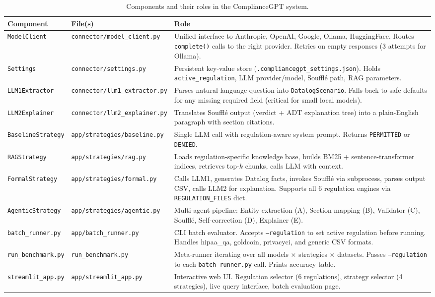 \documentclass[11pt,letterpaper]{article}
\begin{document}
\begin{appendices}
\begin{table}[H]
\centering
\begin{tabularx}{\textwidth}{llX}
\toprule
\textbf{Component} & \textbf{File(s)} & \textbf{Role} \\
\midrule
\texttt{ModelClient} & \texttt{connector/model\_client.py} & Unified interface to Anthropic, OpenAI, Google, Ollama, HuggingFace. Routes \texttt{complete()} calls to the right provider. Retries on empty responses (3 attempts for Ollama). \\
\texttt{Settings} & \texttt{connector/settings.py} & Persistent key-value store (\texttt{.compliancegpt\_settings.json}). Holds \texttt{active\_regulation}, LLM provider/model, Souffl\'{e} path, RAG parameters. \\
\texttt{LLM1Extractor} & \texttt{connector/llm1\_extractor.py} & Parses natural-language question into \texttt{DatalogScenario}. Falls back to safe defaults for any missing required field (critical for small local models). \\
\texttt{LLM2Explainer} & \texttt{connector/llm2\_explainer.py} & Translates Souffl\'{e} output (verdict + ADT explanation tree) into a plain-English paragraph with section citations. \\
\texttt{BaselineStrategy} & \texttt{app/strategies/baseline.py} & Single LLM call with regulation-aware system prompt. Returns \texttt{PERMITTED} or \texttt{DENIED}. \\
\texttt{RAGStrategy} & \texttt{app/strategies/rag.py} & Loads regulation-specific knowledge base, builds BM25 + sentence-transformer indices, retrieves top-$k$ chunks, calls LLM with context. \\
\texttt{FormalStrategy} & \texttt{app/strategies/formal.py} & Calls LLM1, generates Datalog facts, invokes Souffl\'{e} via subprocess, parses output CSV, calls LLM2 for explanation. Supports all 6 regulation engines via \texttt{REGULATION\_FILES} dict. \\
\texttt{AgenticStrategy} & \texttt{app/strategies/agentic.py} & Multi-agent pipeline: Entity extraction (A), Section mapping (B), Validator (C), Souffl\'{e}, Self-correction (D), Explainer (E). \\
\texttt{batch\_runner.py} & \texttt{app/batch\_runner.py} & CLI batch evaluator. Accepts \texttt{--regulation} to set active regulation before running. Handles hipaa\_qa, goldcoin, privacyci, and generic CSV formats. \\
\texttt{run\_benchmark.py} & \texttt{run\_benchmark.py} & Meta-runner iterating over all models $\times$ strategies $\times$ datasets. Passes \texttt{--regulation} to each \texttt{batch\_runner.py} call. Prints accuracy table. \\
\texttt{streamlit\_app.py} & \texttt{app/streamlit\_app.py} & Interactive web UI. Regulation selector (6 regulations), strategy selector (4 strategies), live query interface, batch evaluation page. \\
\bottomrule
\end{tabularx}
\caption{Components and their roles in the ComplianceGPT system.}
\label{tab:components}
\end{table}


\end{appendices}
\end{document}
